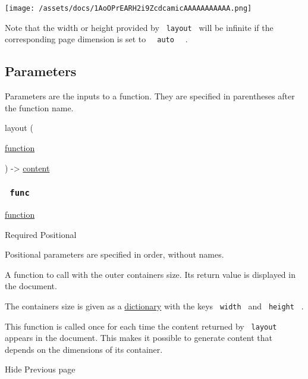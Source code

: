 \texttt{[image: /assets/docs/1AoOPrEARH2i9ZcdcamicAAAAAAAAAAA.png]}

Note that the width or height provided by \texttt{\ layout\ } will be
infinite if the corresponding page dimension is set to
\texttt{\ }{\texttt{\ auto\ }}\texttt{\ } .

\subsection{\texorpdfstring{{ Parameters
}}{ Parameters }}\label{parameters}

\label{parameters-tooltip}
Parameters are the inputs to a function. They are specified in
parentheses after the function name.

{ layout } (

{ \href{/docs/reference/foundations/function/}{function} }

) -\textgreater{} \href{/docs/reference/foundations/content/}{content}

\subsubsection{\texorpdfstring{\texttt{\ func\ }}{ func }}\label{parameters-func}

\href{/docs/reference/foundations/function/}{function}

{Required} {{ Positional }}

\label{parameters-func-positional-tooltip}
Positional parameters are specified in order, without names.

A function to call with the outer container\textquotesingle s size. Its
return value is displayed in the document.

The container\textquotesingle s size is given as a
\href{/docs/reference/foundations/dictionary/}{dictionary} with the keys
\texttt{\ width\ } and \texttt{\ height\ } .

This function is called once for each time the content returned by
\texttt{\ layout\ } appears in the document. This makes it possible to
generate content that depends on the dimensions of its container.

\href{/docs/reference/layout/hide/}{\pandocbounded{}}

{ Hide } { Previous page }

\href{/docs/reference/layout/length/}{\pandocbounded{}}

